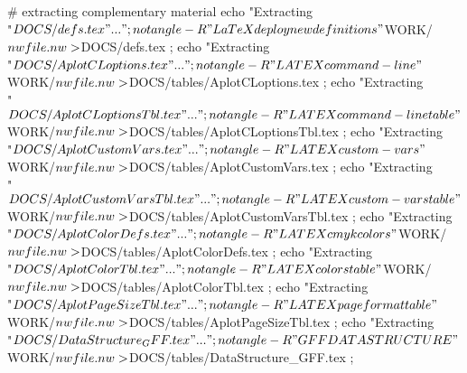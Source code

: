 \documentclass[11pt]{article}
\def\nwendcode{\endtrivlist \endgroup} %
\let\nwdocspar=\par                    %
\begin{document}
\nwenddocs{}\endmoddef
# extracting complementary material 
echo "Extracting \\"$DOCS/defs.tex\\"..." ;
notangle -R"LaTeX deploy new definitions" $WORK/$nwfile.nw \\
         > $DOCS/defs.tex ;
echo "Extracting \\"$DOCS/AplotCLoptions.tex\\"..." ;
notangle -R"LATEX command-line" $WORK/$nwfile.nw \\
         > $DOCS/tables/AplotCLoptions.tex ;
echo "Extracting \\"$DOCS/AplotCLoptionsTbl.tex\\"..." ;
notangle -R"LATEX command-line table" $WORK/$nwfile.nw \\
         > $DOCS/tables/AplotCLoptionsTbl.tex ;
echo "Extracting \\"$DOCS/AplotCustomVars.tex\\"..." ;
notangle -R"LATEX custom-vars" $WORK/$nwfile.nw  \\
         > $DOCS/tables/AplotCustomVars.tex ;
echo "Extracting \\"$DOCS/AplotCustomVarsTbl.tex\\"..." ;
notangle -R"LATEX custom-vars table" $WORK/$nwfile.nw  \\
         > $DOCS/tables/AplotCustomVarsTbl.tex ;
echo "Extracting \\"$DOCS/AplotColorDefs.tex\\"..." ;
notangle -R"LATEX cmyk colors" $WORK/$nwfile.nw  \\
         > $DOCS/tables/AplotColorDefs.tex ;
echo "Extracting \\"$DOCS/AplotColorTbl.tex\\"..." ;
notangle -R"LATEX colors table" $WORK/$nwfile.nw  \\
         > $DOCS/tables/AplotColorTbl.tex ;
echo "Extracting \\"$DOCS/AplotPageSizeTbl.tex\\"..." ;
notangle -R"LATEX page format table" $WORK/$nwfile.nw \\
         > $DOCS/tables/AplotPageSizeTbl.tex ;
echo "Extracting \\"$DOCS/DataStructure_GFF.tex\\"..." ;
notangle -R"GFF DATA STRUCTURE" $WORK/$nwfile.nw \\
         > $DOCS/tables/DataStructure_GFF.tex ;
\nwendcode{}\nwdocspar
\end{document}
